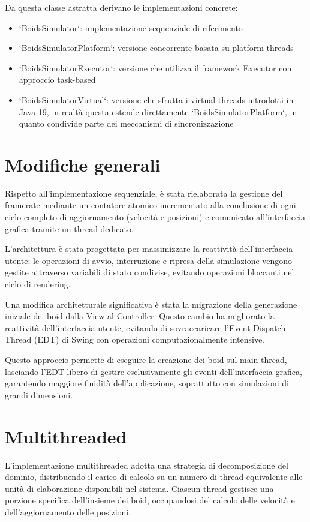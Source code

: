 \documentclass[a4paper,12pt]{report}
\begin{document}
Da questa classe astratta derivano le implementazioni concrete:
\begin{itemize}
    \item `BoidsSimulator`: implementazione sequenziale di riferimento
    \item `BoidsSimulatorPlatform`: versione concorrente basata su platform threads
    \item `BoidsSimulatorExecutor`: versione che utilizza il framework Executor con approccio task-based
    \item `BoidsSimulatorVirtual`: versione che sfrutta i virtual threads introdotti in Java 19, in realtà questa estende direttamente `BoidsSimulatorPlatform`, in quanto condivide parte dei meccanismi di sincronizzazione
\end{itemize}

\section{Modifiche generali}
Rispetto all'implementazione sequenziale, è stata rielaborata la gestione del framerate mediante un contatore atomico incrementato alla conclusione di ogni ciclo completo di aggiornamento (velocità e posizioni) e comunicato all'interfaccia grafica tramite un thread dedicato.

L'architettura è stata progettata per massimizzare la reattività dell'interfaccia utente: le operazioni di avvio, interruzione e ripresa della simulazione vengono gestite attraverso variabili di stato condivise, evitando operazioni bloccanti nel ciclo di rendering.

Una modifica architetturale significativa è stata la migrazione della generazione iniziale dei boid dalla View al Controller. Questo cambio ha migliorato la reattività dell'interfaccia utente, evitando di sovraccaricare l'Event Dispatch Thread (EDT) di Swing con operazioni computazionalmente intensive.

Questo approccio permette di eseguire la creazione dei boid sul main thread, lasciando l'EDT libero di gestire esclusivamente gli eventi dell'interfaccia grafica, garantendo maggiore fluidità dell'applicazione, soprattutto con simulazioni di grandi dimensioni.

\section{Multithreaded}
L'implementazione multithreaded adotta una strategia di decomposizione del dominio, distribuendo il carico di calcolo su un numero di thread equivalente alle unità di elaborazione disponibili nel sistema. Ciascun thread gestisce una porzione specifica dell'insieme dei boid, occupandosi del calcolo delle velocità e dell'aggiornamento delle posizioni.
\end{document}
